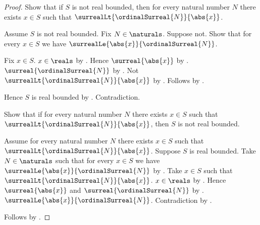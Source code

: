 \begin{proof}
    Show that if $S$ is not real bounded, then for every natural number
        $N$ there exists $x\in S$ such that
            $\surrealLt{\ordinalSurreal{N}}{\abs{x}}$.
    \begin{subproof}
        Assume $S$ is not real bounded.
        Fix $N\in\naturals$.
        Suppose not.
        Show that for every $x\in S$ we have
            $\surrealLe{\abs{x}}{\ordinalSurreal{N}}$.
        \begin{subproof}
            Fix $x\in S$.
            $x\in\reals$ by .
            Hence $\surreal{\abs{x}}$ by
                .
            $\surreal{\ordinalSurreal{N}}$ by
                .
            Not $\surrealLt{\ordinalSurreal{N}}{\abs{x}}$
                by \auto.
            Follows by .
        \end{subproof}
        Hence $S$ is real bounded by
            .
        Contradiction.
    \end{subproof}
    Show that if for every natural number $N$ there exists $x\in S$
        such that $\surrealLt{\ordinalSurreal{N}}{\abs{x}}$, then
        $S$ is not real bounded.
    \begin{subproof}
        Assume for every natural number $N$ there exists $x\in S$
            such that $\surrealLt{\ordinalSurreal{N}}{\abs{x}}$.
        Suppose $S$ is real bounded.
        Take $N\in\naturals$ such that for every $x\in S$ we have
            $\surrealLe{\abs{x}}{\ordinalSurreal{N}}$
            by .
        Take $x\in S$ such that
            $\surrealLt{\ordinalSurreal{N}}{\abs{x}}$.
        $x\in\reals$ by .
        Hence $\surreal{\abs{x}}$ and $\surreal{\ordinalSurreal{N}}$ by
            .
        $\surrealLe{\abs{x}}{\ordinalSurreal{N}}$.
        Contradiction by .
    \end{subproof}
    Follows by \auto.
\end{proof}

